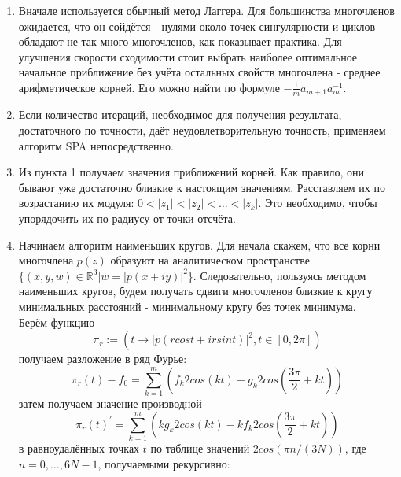 \documentclass[a4paper,12pt]{article}
\begin{document}
\begin{enumerate}
    \item Вначале используется обычный метод Лаггера. Для большинства многочленов ожидается, что он сойдётся - нулями около точек сингулярности и циклов обладают не так много многочленов, как показывает практика. Для улучшения скорости сходимости стоит выбрать наиболее оптимальное начальное приближение без учёта остальных свойств многочлена - среднее арифметическое корней. Его можно найти по формуле $-\frac{1}{m}a_{m+1}a_m^{-1}$.
    \item Если количество итераций, необходимое для получения результата, достаточного по точности, даёт неудовлетворительную точность, применяем алгоритм SPA непосредственно.
    \item Из пункта 1 получаем значения приближений корней. Как правило, они бывают уже достаточно близкие к настоящим значениям. Расставляем их по возрастанию их модуля: $0 < |z_1| < |z_2| < \dots < |z_k|$. Это необходимо, чтобы упорядочить их по радиусу от точки отсчёта.
    \item Начинаем алгоритм наименьших кругов. Для начала скажем, что все корни многочлена $p(z)$ образуют на аналитическом пространстве $\{(x,y,w)\in \mathbb{R}^{3}|w=|p(x+iy)|^{2}$\}. Следовательно, пользуясь методом наименьших кругов, будем получать сдвиги многочленов близкие к кругу минимальных расстояний - минимальному кругу без точек минимума. \\
    Берём функцию 
    \begin{equation}
        \pi_r:=(t\xrightarrow{}|p(rcost+irsint)|^2,t\in [0,2\pi])
    \end{equation}
    получаем разложение в ряд Фурье: \\
\[
\pi_r(t)-f_0=\sum_{k=1}^{m} (f_k2cos(kt)+g_k2cos(\frac{3\pi}{2}+kt))
\]
затем получаем значение производной
\[
\pi_r(t)^{'}=\sum_{k=1}^{m} (kg_k2cos(kt)-kf_k2cos(\frac{3\pi}{2}+kt))
\]
в равноудалённых точках $t$ по таблице значений $2cos(\pi n/(3N))$, где $n=0,\dots,6N-1$, получаемыми рекурсивно:

\end{enumerate}
\end{document}
